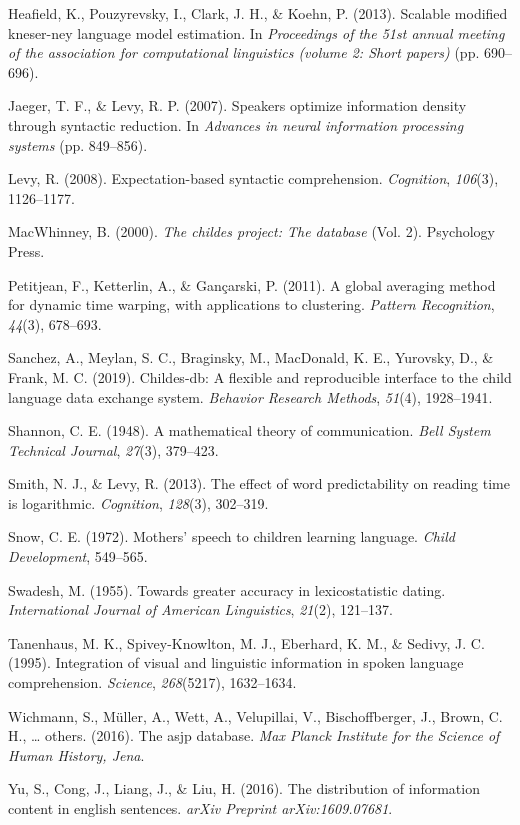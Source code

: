 \documentclass[10pt, letterpaper]{article}
\begin{document}
\begin{cslreferences}
\leavevmode\hypertarget{ref-heafield2013}{}%
Heafield, K., Pouzyrevsky, I., Clark, J. H., \& Koehn, P. (2013).
Scalable modified kneser-ney language model estimation. In
\emph{Proceedings of the 51st annual meeting of the association for
computational linguistics (volume 2: Short papers)} (pp. 690--696).

\leavevmode\hypertarget{ref-jaeger2007}{}%
Jaeger, T. F., \& Levy, R. P. (2007). Speakers optimize information
density through syntactic reduction. In \emph{Advances in neural
information processing systems} (pp. 849--856).

\leavevmode\hypertarget{ref-levy2008}{}%
Levy, R. (2008). Expectation-based syntactic comprehension.
\emph{Cognition}, \emph{106}(3), 1126--1177.

\leavevmode\hypertarget{ref-macwhinney2000}{}%
MacWhinney, B. (2000). \emph{The childes project: The database} (Vol.
2). Psychology Press.

\leavevmode\hypertarget{ref-petitjean2011}{}%
Petitjean, F., Ketterlin, A., \& Gançarski, P. (2011). A global
averaging method for dynamic time warping, with applications to
clustering. \emph{Pattern Recognition}, \emph{44}(3), 678--693.

\leavevmode\hypertarget{ref-sanchez2019}{}%
Sanchez, A., Meylan, S. C., Braginsky, M., MacDonald, K. E., Yurovsky,
D., \& Frank, M. C. (2019). Childes-db: A flexible and reproducible
interface to the child language data exchange system. \emph{Behavior
Research Methods}, \emph{51}(4), 1928--1941.

\leavevmode\hypertarget{ref-shannon1948}{}%
Shannon, C. E. (1948). A mathematical theory of communication.
\emph{Bell System Technical Journal}, \emph{27}(3), 379--423.

\leavevmode\hypertarget{ref-smith2013}{}%
Smith, N. J., \& Levy, R. (2013). The effect of word predictability on
reading time is logarithmic. \emph{Cognition}, \emph{128}(3), 302--319.

\leavevmode\hypertarget{ref-snow1972}{}%
Snow, C. E. (1972). Mothers' speech to children learning language.
\emph{Child Development}, 549--565.

\leavevmode\hypertarget{ref-swadesh1955}{}%
Swadesh, M. (1955). Towards greater accuracy in lexicostatistic dating.
\emph{International Journal of American Linguistics}, \emph{21}(2),
121--137.

\leavevmode\hypertarget{ref-tanenhaus1995}{}%
Tanenhaus, M. K., Spivey-Knowlton, M. J., Eberhard, K. M., \& Sedivy, J.
C. (1995). Integration of visual and linguistic information in spoken
language comprehension. \emph{Science}, \emph{268}(5217), 1632--1634.

\leavevmode\hypertarget{ref-wichmann2016}{}%
Wichmann, S., Müller, A., Wett, A., Velupillai, V., Bischoffberger, J.,
Brown, C. H., \ldots{} others. (2016). The asjp database. \emph{Max
Planck Institute for the Science of Human History, Jena}.

\leavevmode\hypertarget{ref-yu2016}{}%
Yu, S., Cong, J., Liang, J., \& Liu, H. (2016). The distribution of
information content in english sentences. \emph{arXiv Preprint
arXiv:1609.07681}.
\end{cslreferences}


\end{document}
